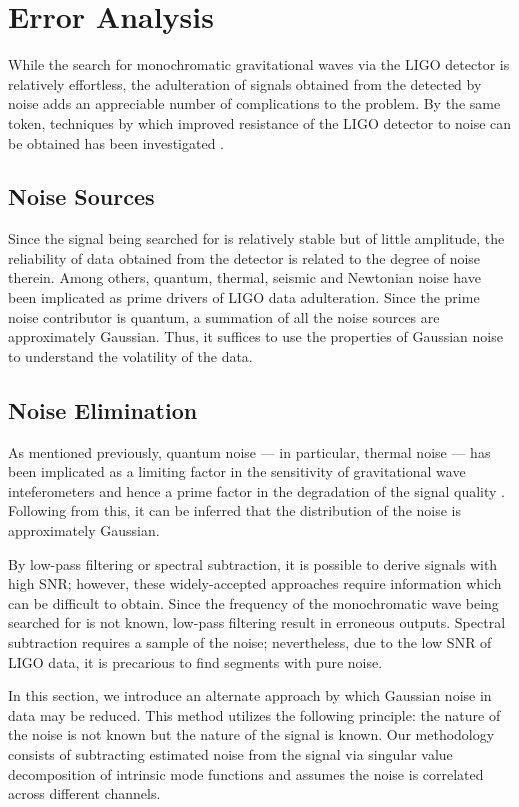 \documentclass[onecolumn, groupedaddress, 10pt]{revtex4-1}
\begin{document}
\section{Error Analysis}
While the search for monochromatic gravitational waves via the LIGO detector is relatively effortless, the adulteration of signals obtained from the detected by noise adds an appreciable number of complications to the problem. By the same token, techniques by which improved resistance of the LIGO detector to noise can be obtained has been investigated \citep{abramovici1996improved} \citep{aasi2013enhanced}.

\subsection{Noise Sources}
Since the signal being searched for is relatively stable but of little amplitude, the reliability of data obtained from the detector is related to the degree of noise therein. Among others, quantum, thermal, seismic and Newtonian noise have been implicated as prime drivers of LIGO data adulteration. Since the prime noise contributor is quantum, a summation of all the noise sources are approximately Gaussian. Thus, it suffices to use the properties of Gaussian noise to understand the volatility of the data.

\subsection{Noise Elimination}
As mentioned previously, quantum noise --- in particular, thermal noise --- has been implicated as a limiting factor in the sensitivity of gravitational wave inteferometers and hence a prime factor in the degradation of the signal quality \citep{Saulson}. Following from this, it can be inferred that the distribution of the noise is approximately Gaussian.

By low-pass filtering or spectral subtraction, it is possible to derive signals with high SNR; however, these widely-accepted approaches require information which can be difficult to obtain. Since the frequency of the monochromatic wave being searched for is not known, low-pass filtering result in erroneous outputs. Spectral subtraction requires a sample of the noise; nevertheless, due to the low SNR of LIGO data, it is precarious to find segments with pure noise.

In this section, we introduce an alternate approach by which Gaussian noise in data may be reduced. This method utilizes the following principle: the nature of the noise is not known but the nature of the signal is known. Our methodology consists of subtracting estimated noise from the signal via singular value decomposition of intrinsic mode functions and assumes the noise is correlated across different channels.
\end{document}
